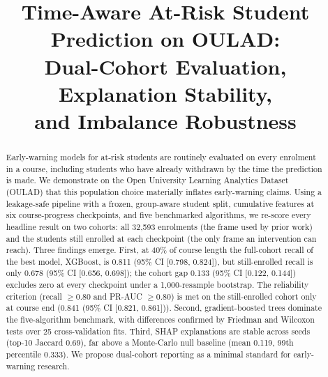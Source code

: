 \documentclass[conference]{IEEEtran}
\begin{document}
\title{Time-Aware At-Risk Student Prediction on OULAD:\\
Dual-Cohort Evaluation, Explanation Stability,\\
and Imbalance Robustness}

\author{
}

\maketitle

\begin{abstract}
Early-warning models for at-risk students are routinely evaluated on every
enrolment in a course, including students who have already withdrawn by the
time the prediction is made. We demonstrate on the Open University Learning
Analytics Dataset (OULAD) that this population choice materially inflates
early-warning claims. Using a leakage-safe pipeline with a frozen,
group-aware student split, cumulative features at six course-progress
checkpoints, and five benchmarked algorithms, we re-score every headline
result on two cohorts: all 32,593 enrolments (the frame used by prior work)
and the students still enrolled at each checkpoint (the only frame an
intervention can reach). Three findings emerge. First, at 40\% of course
length the full-cohort recall of the best model, XGBoost, is
0.811 (95\% CI [0.798, 0.824]), but still-enrolled recall is only
0.678 (95\% CI [0.656, 0.698]); the cohort gap 0.133 (95\% CI [0.122, 0.144]) excludes zero
at every checkpoint under a 1,000-resample bootstrap. The reliability
criterion (recall $\geq 0.80$ and PR-AUC $\geq 0.80$) is met on the
still-enrolled cohort only at course end (0.841 (95\% CI [0.821, 0.861])).
Second, gradient-boosted trees dominate the five-algorithm benchmark, with
differences confirmed by Friedman and Wilcoxon tests over 25
cross-validation fits. Third, SHAP explanations are stable across seeds
(top-10 Jaccard 0.69), far above a Monte-Carlo null baseline
(mean 0.119, 99th percentile 0.333). We propose
dual-cohort reporting as a minimal standard for early-warning research.
\end{abstract}
\end{document}
